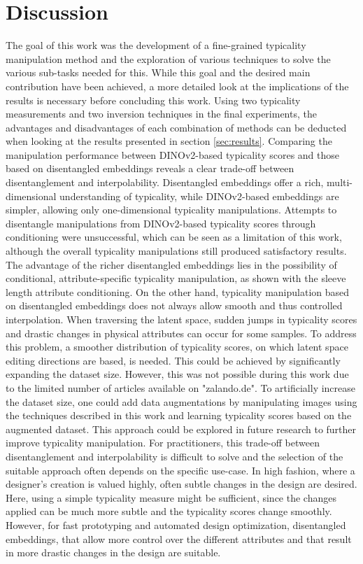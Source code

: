 \section{Discussion}
The goal of this work was the development of a fine-grained typicality manipulation method and the
exploration of various techniques to solve the various sub-tasks needed for this. While this goal and the desired main contribution have been achieved, a more detailed look at the implications of the results is necessary before concluding this work. Using two typicality measurements and two inversion techniques in the final experiments, the advantages and disadvantages of each combination of methods can be deducted when looking at the results presented in section \ref{sec:results}. Comparing the manipulation performance between DINOv2-based typicality scores and those based on disentangled embeddings reveals a clear trade-off between disentanglement and interpolability. Disentangled embeddings offer a rich, multi-dimensional understanding of typicality, while DINOv2-based embeddings are simpler, allowing only one-dimensional typicality manipulations. Attempts to disentangle manipulations from DINOv2-based typicality scores through conditioning were unsuccessful, which can be seen as a limitation of this work, although the overall typicality manipulations still produced satisfactory results. The advantage of the richer disentangled embeddings lies in the possibility of conditional, attribute-specific typicality manipulation, as shown with the sleeve length attribute conditioning. On the other hand, typicality manipulation based on disentangled embeddings does not always allow smooth and thus controlled interpolation. When traversing the latent space, sudden jumps in typicality scores and drastic changes in physical attributes can occur for some samples. To address this problem, a smoother distribution of typicality scores, on which latent space editing directions are based, is needed. This could be achieved by significantly expanding the dataset size. However, this was not possible during this work due to the limited number of articles available on "zalando.de". To artificially increase the dataset size, one could add data augmentations by manipulating images using the techniques described in this work and learning typicality scores based on the augmented dataset. This approach could be explored in future research to further improve typicality manipulation. For practitioners, this trade-off between disentanglement and interpolability is difficult to solve and the selection of the suitable approach often depends on the specific use-case. In high fashion, where a designer's creation is valued highly, often subtle changes in the design are desired. Here, using a simple typicality measure might be sufficient, since the changes applied can be much more subtle and the typicality scores change smoothly. However, for fast prototyping and automated design optimization, disentangled embeddings, that allow more control over the different attributes and that result in more drastic changes in the design are suitable.\\
